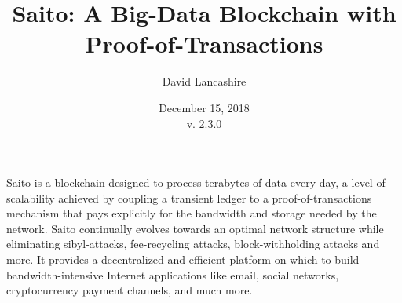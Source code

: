 \documentclass[11.5pt, oneside]{article}   	%
\title{Saito: A Big-Data Blockchain with Proof-of-Transactions}
\author{David Lancashire}
\date{December 15, 2018\\v. 2.3.0}
\begin{document}
\maketitle


\begin{onecolabstract}
Saito is a blockchain designed to process terabytes of data every day, a level of scalability achieved by coupling a transient ledger to a proof-of-transactions mechanism that pays explicitly for the bandwidth and storage needed by the network. Saito continually evolves towards an optimal network structure while eliminating sibyl-attacks, fee-recycling attacks, block-withholding attacks and more. It provides a decentralized and efficient platform on which to build bandwidth-intensive Internet applications like email, social networks, cryptocurrency payment channels, and much more.
\end{onecolabstract}
\end{document}
